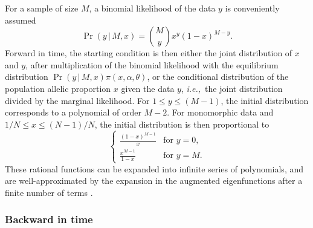 \documentclass[preprint]{elsarticle}
\newcommand\given{{\,|\,}}
\newcommand\ie{{\it i.e.,}}
\begin{document}
For a sample of size $M$, a binomial likelihood of the data $y$ is conveniently assumed
\begin{equation}
\Pr(y\given M, x) = \binom{M}{y} x^y (1-x)^{M-y}.
\end{equation}
Forward in time, the starting condition is then either the joint distribution of $x$ and $y$, after multiplication of the binomial likelihood with the equilibrium distribution $\Pr(y\given M, x)\pi(x, \alpha,\theta)$, or the conditional distribution of the population allelic proportion $x$ given the data $y$, \ie\ the joint distribution divided by the marginal likelihood. For $1\leq y\leq (M-1)$, the initial distribution corresponds to a polynomial of order $M-2$. For monomorphic data and $1/N\leq x \leq (N-1)/N$, the initial distribution is then proportional to
\begin{equation}
\begin{cases}
\frac{(1-x)^{M-1}}{x}&\text{for $y=0$,}\\
\frac{x^{M-1}}{1-x} &\text{for $y=M$.}
\end{cases}
\end{equation}
These rational functions can be expanded into infinite series of polynomials, and are well-approximated by the expansion in the augmented eigenfunctions after a finite number of terms \citep{Vogl16}.

\subsubsection{Backward in time}
\end{document}
